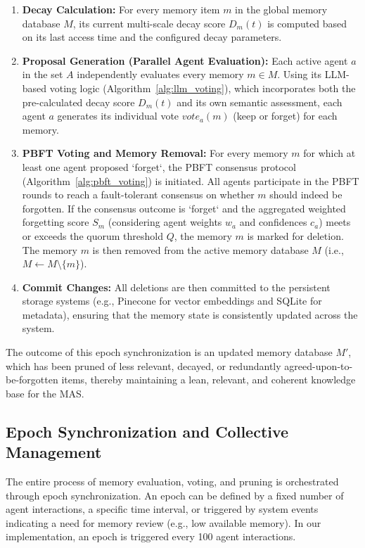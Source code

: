 \documentclass[conference]{IEEEtran}
\begin{document}
\begin{enumerate}
    \item \textbf{Decay Calculation:} For every memory item $m$ in the global memory database $M$, its current multi-scale decay score $D_m(t)$ is computed based on its last access time and the configured decay parameters.
    \item \textbf{Proposal Generation (Parallel Agent Evaluation):} Each active agent $a$ in the set $A$ independently evaluates every memory $m \in M$. Using its LLM-based voting logic (Algorithm~\ref{alg:llm_voting}), which incorporates both the pre-calculated decay score $D_m(t)$ and its own semantic assessment, each agent $a$ generates its individual vote $vote_a(m)$ (keep or forget) for each memory.
    \item \textbf{PBFT Voting and Memory Removal:} For every memory $m$ for which at least one agent proposed `forget`, the PBFT consensus protocol (Algorithm~\ref{alg:pbft_voting}) is initiated. All agents participate in the PBFT rounds to reach a fault-tolerant consensus on whether $m$ should indeed be forgotten. If the consensus outcome is `forget` and the aggregated weighted forgetting score $S_m$ (considering agent weights $w_a$ and confidences $c_a$) meets or exceeds the quorum threshold $Q$, the memory $m$ is marked for deletion. The memory $m$ is then removed from the active memory database $M$ (i.e., $M \leftarrow M \setminus \{m\}$). 
    \item \textbf{Commit Changes:} All deletions are then committed to the persistent storage systems (e.g., Pinecone for vector embeddings and SQLite for metadata), ensuring that the memory state is consistently updated across the system.
\end{enumerate}

The outcome of this epoch synchronization is an updated memory database $M'$, which has been pruned of less relevant, decayed, or redundantly agreed-upon-to-be-forgotten items, thereby maintaining a lean, relevant, and coherent knowledge base for the MAS.

\subsection{Epoch Synchronization and Collective Management}

The entire process of memory evaluation, voting, and pruning is orchestrated through epoch synchronization. An epoch can be defined by a fixed number of agent interactions, a specific time interval, or triggered by system events indicating a need for memory review (e.g., low available memory). In our implementation, an epoch is triggered every 100 agent interactions.
\end{document}

